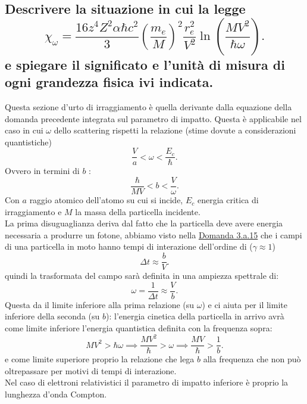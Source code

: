 \subsection[]{Descrivere la situazione in cui la legge
	\[
		\chi_{\omega}=\frac{16 z^4 Z^2 \alpha \hbar c^2}{3} \left( \frac{m_e}{M} \right)^2 \frac{r_e^2}{V^2} \ln\left( \frac{MV^2}{\hbar \omega} \right) 
	.\] 
e spiegare il significato e l'unità di misura di ogni grandezza fisica ivi indicata.
}\label{sec:4.a.14}
Questa sezione d'urto di irraggiamento è quella derivante dalla equazione della domanda precedente integrata sul parametro di impatto. Questa è applicabile nel caso in cui $\omega$ dello scattering rispetti la relazione (stime dovute a considerazioni quantistiche) \[
	\frac{V}{a}< \omega < \frac{E_{c}}{\hbar}
.\] 
Ovvero in termini di $b$ :
\[
	\frac{\hbar}{M V} < b < \frac{V}{\omega}
.\] 
Con $a$ raggio atomico dell'atomo su cui si incide, $E_{c}$ energia critica di irraggiamento e $M$ la massa della particella incidente.\\
La prima disuguaglianza deriva dal fatto che la particella deve avere energia necessaria a produrre un fotone, abbiamo visto nella \hyperref[sec:3.a.15]{Domanda 3.a.15} che i campi di una particella in moto hanno tempi di interazione dell'ordine di ($\gamma \approx 1$)\[
	\Delta t \approx \frac{b}{V} 
.\] 
quindi la trasformata del campo sarà definita in una ampiezza spettrale di: \[
	\omega = \frac{1}{\Delta t} \approx \frac{V}{b}
.\] 
Questa da il limite inferiore alla prima relazione (su $\omega$) e ci aiuta per il limite inferiore della seconda (su $b$): l'energia cinetica della particella in arrivo avrà come limite inferiore l'energia quantistica definita con la frequenza sopra: \[
	MV^2>\hbar \omega \implies \frac{MV^2}{\hbar}>\omega \implies \frac{MV}{\hbar} > \frac{1}{b}
.\] 
e come limite superiore proprio la relazione che lega $b$ alla frequenza che non può oltrepassare per motivi di tempi di interazione.\\
Nel caso di elettroni relativistici il parametro di impatto inferiore è proprio la lunghezza d'onda Compton.

